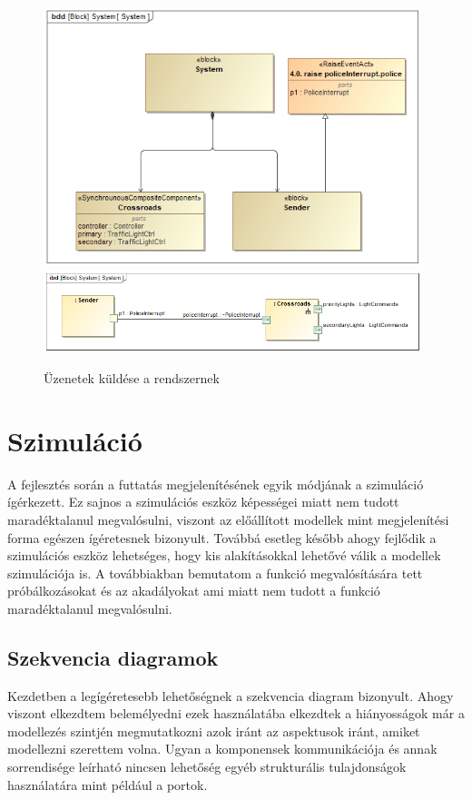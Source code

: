 \begin{figure}[!ht]
	\centering
	\includegraphics[width=110mm, keepaspectratio]{figures/contribution/trace1.png}
	\includegraphics[width=110mm, keepaspectratio]{figures/contribution/trace2.png}
	\caption{Üzenetek küldése a rendszernek}
	\label{fig:trace-signals}
\end{figure}


\newpage\section{Szimuláció}

A fejlesztés során a futtatás megjelenítésének egyik módjának a szimuláció ígérkezett. Ez sajnos a szimulációs eszköz képességei miatt nem tudott maradéktalanul megvalósulni, viszont az előállított modellek mint megjelenítési forma egészen ígéretesnek bizonyult. Továbbá esetleg később ahogy fejlődik a szimulációs eszköz lehetséges, hogy kis alakításokkal lehetővé válik a modellek szimulációja is. A továbbiakban bemutatom a funkció megvalósítására tett próbálkozásokat és az akadályokat ami miatt nem tudott a funkció maradéktalanul megvalósulni.

\subsection{Szekvencia diagramok}

Kezdetben a legígéretesebb lehetőségnek a szekvencia diagram bizonyult. Ahogy viszont elkezdtem belemélyedni ezek használatába elkezdtek a hiányosságok már a modellezés szintjén megmutatkozni azok iránt az aspektusok iránt, amiket modellezni szerettem volna. Ugyan a komponensek kommunikációja és annak sorrendisége leírható nincsen lehetőség egyéb strukturális tulajdonságok használatára mint például a portok.

